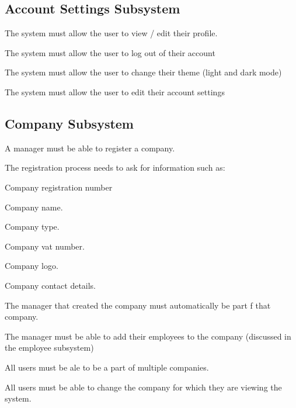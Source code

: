 \documentclass{article}
\begin{document}
	\subsection*{Account Settings Subsystem}	
	\begin{list}{R.}{}
	\item The system must allow the user to view / edit their profile.
	\item The system must allow the user to log out of their account 
	\item The system must allow the user to change their theme (light and dark mode)
	\item The system must allow the user to edit their account settings 
	\end{list}
	
	\subsection*{Company Subsystem}	
	\begin{list}{R.}{}
		\item A manager must be able to register a company.
		\item The registration process needs to ask for information such as: 
		\begin{list}{R.}{}
			\item Company registration number
			\item Company name.
			\item Company type.
			\item Company vat number.
			\item Company logo.
			\item Company contact details.
		\end{list} 
		\item The manager that created the company must automatically be part f that company. 
		\item The manager must be able to add their employees to the company (discussed in the employee subsystem) 
		\item All users must be ale to be a part of multiple companies.
		\item All users must be able to change the company for which they are viewing the system. 
	\end{list}
	
\end{document}

